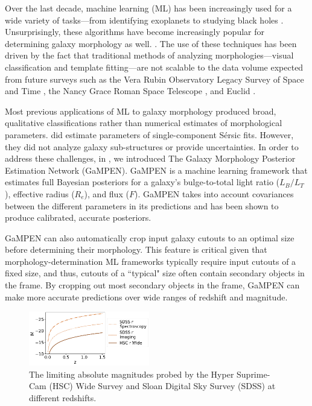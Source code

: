 \documentclass[linenumbers,twocolumn,twocolappendix]{aastex631}
\newcommand\sersic{S\'ersic}
\newcommand\gampen{GaMPEN}
\begin{document}
\begin{CJK*}{UTF8}{gbsn}
Over the last decade, machine learning (ML) has been increasingly used for a wide variety of tasks---from identifying exoplanets to studying black holes \citep[e.g.,][]{ml_pz,ml_sz,Shallue2018IdentifyingKepler-90,Sharma2020ApplicationClassification,Natarajan2021QuasarNet:Holes}. Unsurprisingly, these algorithms have become increasingly popular for determining galaxy morphology as well. \citep[e.g.,][]{Dieleman2015Rotation-invariantPrediction, Huertas-Company2015ALEARNING, Tuccillo2018DeepFitting, gamornet_paper, Hausen2020MorpheusData, Walmsley2020GalaxyLearning, Cheng2021GalaxyNetworks, Vega-Ferrero2021PushingSurvey, Tarsitano2022ImageLearning}. The use of these techniques has been driven by the fact that  traditional methods of analyzing morphologies---visual classification and template fitting---are not scalable to the data volume expected from future surveys such as the Vera Rubin Observatory Legacy Survey of Space and Time \citep[LSST;][]{lsst}, the Nancy Grace Roman Space Telescope \citep[NGRST;][]{ngrst}, and Euclid \citep{euclid}. 

Most previous applications of ML to galaxy morphology produced broad, qualitative classifications rather than numerical estimates of morphological parameters. \citet{Tuccillo2018DeepFitting} did estimate parameters of single-component \sersic{} fits. However, they did not analyze galaxy sub-structures or provide uncertainties. In order to address these challenges, in \citet{gampen_software_paper}, we introduced The Galaxy Morphology Posterior Estimation Network (\gampen{}). \gampen{} is a machine learning framework that estimates full Bayesian posteriors for a galaxy's bulge-to-total light ratio ($L_B/L_T$), effective radius ($R_e$), and flux ($F$). \gampen{} takes into account covariances between the different parameters in its predictions and has been shown to produce calibrated, accurate posteriors. 

\gampen{} can also automatically crop input galaxy cutouts to an optimal size before determining their morphology. This feature is critical given that morphology-determination ML frameworks typically require input cutouts of a fixed size, and thus, cutouts of a ``typical" size often contain secondary objects in the frame. By cropping out most secondary objects in the frame, \gampen{} can make more accurate predictions over wide ranges of redshift and magnitude. 

\begin{figure}[htb]
    \centering
    \includegraphics[width = 0.47\textwidth]{hsc_depth.png}
    \caption{The limiting absolute magnitudes probed by the Hyper Suprime-Cam (HSC) Wide Survey and Sloan Digital Sky Survey (SDSS) at different redshifts.}
    \label{fig:hsc_depth}
\end{figure}


\end{CJK*}
\end{document}

